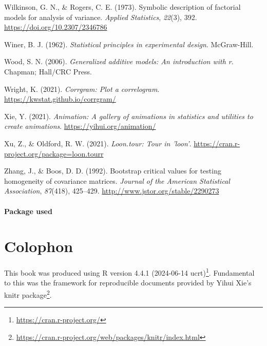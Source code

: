 \documentclass[
  letterpaper,
  10pt,
  krantz2]{krantz}
\newlength{\cslhangindent}
\newenvironment{CSLReferences}[2] %
 {\begin{list}{}{%
  \setlength{\itemindent}{0pt}
  \setlength{\leftmargin}{0pt}
  \setlength{\parsep}{0pt}
  \ifodd #1
   \setlength{\leftmargin}{\cslhangindent}
   \setlength{\itemindent}{-1\cslhangindent}
  \fi
  \setlength{\itemsep}{#2\baselineskip}}}
 {\end{list}}
\providecommand{\href}[2]{#2\footnote{\url{#1}}}
\begin{document}
\begin{CSLReferences}{1}{0}
Wilkinson, G. N., \& Rogers, C. E. (1973). Symbolic description of
factorial models for analysis of variance. \emph{Applied Statistics},
\emph{22}(3), 392. \url{https://doi.org/10.2307/2346786}

Winer, B. J. (1962). \emph{Statistical principles in experimental
design}. McGraw-Hill.

Wood, S. N. (2006). \emph{Generalized additive models: An introduction
with r}. Chapman; Hall/CRC Press.

Wright, K. (2021). \emph{Corrgram: Plot a correlogram}.
\url{https://kwstat.github.io/corrgram/}

Xie, Y. (2021). \emph{Animation: A gallery of animations in statistics
and utilities to create animations}. \url{https://yihui.org/animation/}

Xu, Z., \& Oldford, R. W. (2021). \emph{Loon.tour: Tour in 'loon'}.
\url{https://cran.r-project.org/package=loon.tourr}

Zhang, J., \& Boos, D. D. (1992). Bootstrap critical values for testing
homogeneity of covariance matrices. \emph{Journal of the American
Statistical Association}, \emph{87}(418), 425--429.
\url{http://www.jstor.org/stable/2290273}

\end{CSLReferences}

\subsubsection*{Package used}\label{package-used}


\chapter*{Colophon}\label{colophon}


This book was produced using \href{https://cran.r-project.org/}{R
version 4.4.1 (2024-06-14 ucrt)}. Fundamental to this was the framework
for reproducible documents provided by Yihui Xie's
\href{https://cran.r-project.org/web/packages/knitr/index.html}{knitr
package}.
\end{document}
